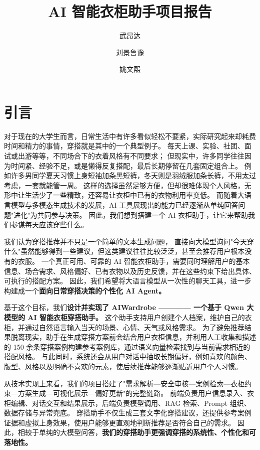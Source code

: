 \documentclass{applemlr}
\title{AI 智能衣柜助手项目报告}
\author{武昂达}
\author{刘景鲁豫}
\author{姚文熙}
\affiliation{上海交通大学自动化与感知学院}
\begin{document}
\maketitle

\tableofcontents
\newpage

\section{引言}
\label{sec:intro}

对于现在的大学生而言，日常生活中有许多看似轻松不要紧，实际研究起来却耗费时间和精力的事情，穿搭就是其中的一个典型例子。
每天上课、实验、社团、面试或出游等等，不同场合下的衣着风格有不同要求；
但现实中，许多同学往往因为时间紧、经验不足，或是懒得反复搭配，最后长期停留在几套固定组合上。
例如许多男同学夏天习惯上身短袖加条黑短裤，冬天则是羽绒服加条长裤，不用太过考虑，一套就能管一周。
这样的选择虽然足够方便，但却很难体现个人风格，无形中让生活少了一些精致，还容易让衣柜中已有的衣物利用率变低。
而随着大语言模型与多模态生成技术的发展，AI 工具展现出的能力已经逐渐从单纯回答问题"进化"为共同参与决策。
因此，我们想到搭建一个 AI 衣柜助手，让它来帮助我们参谋每天应该穿些什么。

我们认为穿搭推荐并不只是一个简单的文本生成问题，
直接向大模型询问"今天穿什么"虽然能够得到一些建议，但这类建议往往比较泛泛，甚至会推荐用户根本没有的衣服。
一个真正可用、可靠的 AI 智能衣柜助手，需要同时理解用户的基本信息、场合需求、风格偏好、已有衣物以及历史反馈，并在这些约束下给出具体、可执行的搭配方案。
因此，我们希望将大语言模型从一次性的聊天工具，进一步构建成一个\textbf{面向日常穿搭决策的个性化 AI Agent。}

基于这个目标，我们\textbf{设计并实现了 AIWardrobe ———— 一个基于 Qwen 大模型的 AI 智能衣柜穿搭助手。}
这个助手支持用户创建个人档案，维护自己的衣柜，并通过自然语言输入当天的场景、心情、天气或风格需求。
为了避免推荐结果脱离现实，助手在生成穿搭方案前会结合用户衣柜信息，并利用人工收集和描述的 150 余条穿搭案例构建参考案例库，通过语义向量检索找到与当前需求相近的搭配风格。
与此同时，系统还会从用户对话中抽取长期偏好，例如喜欢的颜色、版型、风格以及明确不喜欢的元素，使后续推荐能够逐渐贴近用户个人习惯。

从技术实现上来看，我们的项目搭建了"需求解析—安全审核—案例检索—衣柜约束—方案生成—可视化展示—偏好更新"的完整链路。
前端负责用户信息录入、衣柜编辑、对话交互和结果展示，后端负责模型调用、RAG 检索、Prompt 组织、数据存储与异常兜底。
穿搭助手不仅生成三套文字化穿搭建议，还提供参考案例证据和虚拟上身效果，使用户能够更直观地判断推荐是否符合自己的需求。
因此，相较于单纯的大模型问答，\textbf{我们的穿搭助手更强调穿搭的系统性、个性化和可落地性。}
\end{document}
